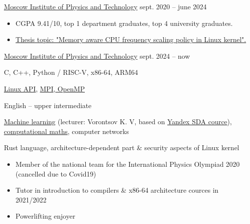         {\href{https://mipt.ru}{Moscow Institute of Physics and Technology}}
        {sept. 2020 -- june 2024}{}

    \begin{itemize}
        \item CGPA 9.41/10, top 1 department graduates, top 4 university graduates.
        \item \href{https://github.com/Vokerlee/macfm-governor-thesis/blob/master/thesis/ru/thesis.pdf}
                   {Thesis topic: "Memory aware CPU frequency scaling policy in Linux kernel".}
    \end{itemize}

        {\href{https://mipt.ru}{Moscow Institute of Physics and Technology}}
        {sept. 2024 -- now}{}


    C, C++, Python / RISC-V, x86-64, ARM64
    \smallskip

    \href{https://github.com/Vokerlee/linux-api-course}{Linux API},
    \href{https://github.com/Vokerlee/parallel-computing-mipt}{MPI, OpenMP}
    \smallskip

    English -- upper intermediate

    \href{https://github.com/Vokerlee/machine-learning-mipt}{Machine learning} (lecturer: Vorontsov K. V, based on
        \href{https://dataschool.yandex.com}{Yandex SDA cource}),
    \href{https://github.com/Vokerlee/computational-maths-mipt}{computational maths},
    computer networks
    \smallskip

    Rust language, architecture-dependent part \& security aspects of Linux kernel
    \smallskip

    \begin{itemize}
        \item Member of the national team for the International Physics Olympiad 2020 (cancelled due to Covid19)
        \item Tutor in introduction to compilers \& x86-64 architecture cources in 2021/2022
        \item Powerlifting enjoyer
    \end{itemize}

